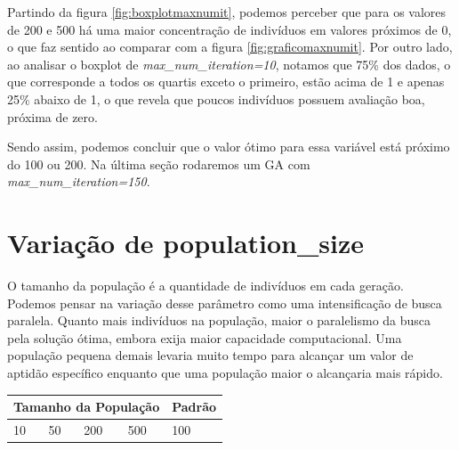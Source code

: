 \documentclass[12pt]{article}
\begin{document}
	Partindo da figura \ref{fig:boxplotmaxnumit}, podemos perceber que para os valores de 200 e 500 há uma maior concentração de indivíduos em valores próximos de 0, o que faz sentido ao comparar com a figura \ref{fig:graficomaxnumit}. Por outro lado, ao analisar o boxplot de \textit{max\_num\_iteration=10}, notamos que 75\% dos dados, o que corresponde a todos os quartis exceto o primeiro, estão acima de 1 e apenas 25\% abaixo de 1, o que revela que poucos indivíduos possuem avaliação boa, próxima de zero.
	
	Sendo assim, podemos concluir que o valor ótimo para essa variável está próximo do 100 ou 200. Na última seção rodaremos um GA com \textit{max\_num\_iteration=150}.
	
	
	\section{Variação de population\_size}
	
	O tamanho da população é a quantidade de indivíduos em cada geração. Podemos pensar na variação desse parâmetro como uma intensificação de busca paralela. Quanto mais indivíduos na população, maior o paralelismo da busca pela solução ótima, embora exija maior capacidade computacional. Uma população pequena demais levaria muito tempo para alcançar um valor de aptidão específico enquanto que uma população maior o alcançaria mais rápido.
	
	\begin{table}[H]
		\centering
		\begin{tabular}{|l|l|l|l|l|}
			\hline
			\multicolumn{4}{|l|}{Tamanho da População}& Padrão \\ \hline
			10   & 50    & 200    & 500   & 100 \\ \hline
		\end{tabular}
	\end{table}
	
\end{document}

